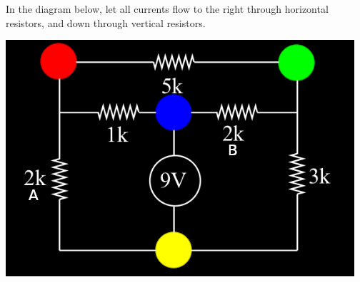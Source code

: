 \documentclass{article}
\begin{document}
\bigskip
{}

In the diagram below, let all currents flow to the right through horizontal resistors, and down through vertical resistors.
\begin{center}
    \includegraphics[scale=.65]{circuit.png}
\end{center}
\end{document}

